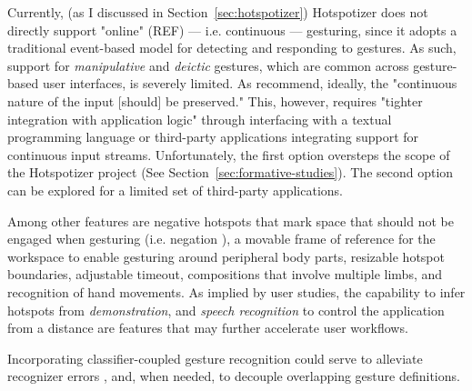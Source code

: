 Currently, (as I discussed in Section~\ref{sec:hotspotizer}) Hotspotizer does not directly support "online" (REF) --- i.e. continuous --- gesturing, since it adopts a traditional event-based model for detecting and responding to gestures. As such, support for \emph{manipulative} and \emph{deictic} gestures, which are common across gesture-based user interfaces, is severely limited. As \textcite{Myers:2000} recommend, ideally, the "continuous nature of the input [should] be preserved." This, however, requires "tighter integration with application logic" \parencite{Hartmann:2007} through interfacing with a textual programming language or third-party applications integrating support for continuous input streams. Unfortunately,  the first option oversteps the scope of the Hotspotizer project (See Section~\ref{sec:formative-studies}). The second option can be explored for a limited set of third-party applications.

Among other features are negative hotspots that mark space that should not be engaged when gesturing (i.e. negation \parencite{Hoste:2014}), a movable frame of reference for the workspace to enable gesturing around peripheral body parts, resizable hotspot boundaries, adjustable timeout, compositions that involve multiple limbs, and recognition of hand movements.  As implied by user studies, the capability to infer hotspots from \emph{demonstration}, and \emph{speech recognition} to control the application from a distance are features that may further accelerate user workflows.

Incorporating classifier-coupled gesture recognition \parencite{Hoste:2013} could serve to alleviate recognizer errors \parencite{Myers:2000}, and, when needed, to decouple overlapping gesture definitions.
